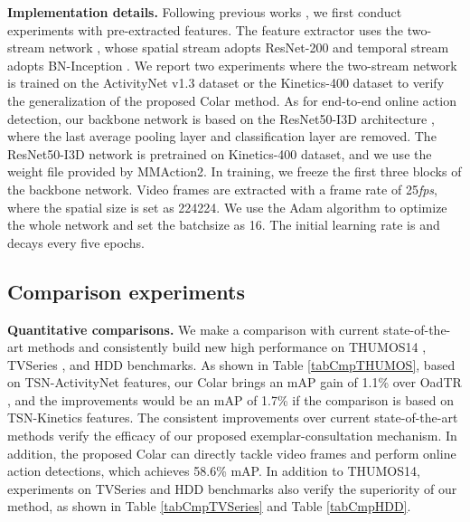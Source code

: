\documentclass[10pt,twocolumn,letterpaper]{article}
\begin{document}
\textbf{Implementation details.} Following previous works \cite{de2018modeling, xu2019temporal, eun2020learning, wang2021oadtr}, we first conduct experiments with pre-extracted features. The feature extractor uses the two-stream network \cite{xiong2016cuhk}, whose spatial stream adopts ResNet-200 \cite{he2016deep} and temporal stream adopts BN-Inception \cite{ioffe2015batch}. We report two experiments where the two-stream network \cite{wang2016temporal, xiong2016cuhk} is trained on the ActivityNet v1.3 dataset \cite{caba2015activitynet} or the Kinetics-400 \cite{carreira2017quo} dataset to verify the generalization of the proposed Colar method. As for end-to-end online action detection, our backbone network is based on the ResNet50-I3D architecture \cite{wang2018non}, where the last average pooling layer and classification layer are removed. The ResNet50-I3D network is pretrained on Kinetics-400 \cite{carreira2017quo} dataset, and we use the weight file provided by MMAction2\cite{2020mmaction2}. In training, we freeze the first three blocks of the backbone network. Video frames are extracted with a frame rate of 25\textit{fps}, where the spatial size is set as 224224. We use the Adam \cite{kingma2014adam} algorithm to optimize the whole network and set the batchsize as 16. The initial learning rate is  and decays every five epochs.


\subsection{Comparison experiments}
\label{ExpCmp}

\textbf{Quantitative comparisons.} We make a comparison with current state-of-the-art methods \cite{de2018modeling, xu2019temporal, eun2020learning, wang2021oadtr} and consistently build new high performance on THUMOS14 \cite{THUMOS14}, TVSeries \cite{de2016online}, and HDD \cite{ramanishka2018toward} benchmarks. As shown in Table \ref{tabCmpTHUMOS}, based on TSN-ActivityNet features, our Colar brings an mAP gain of 1.1\% over OadTR \cite{wang2021oadtr}, and the improvements would be an mAP of 1.7\% if the comparison is based on TSN-Kinetics features. The consistent improvements over current state-of-the-art methods verify the efficacy of our proposed exemplar-consultation mechanism. In addition, the proposed Colar can directly tackle video frames and perform online action detections, which achieves 58.6\% mAP. In addition to THUMOS14, experiments on TVSeries \cite{de2016online} and HDD \cite{ramanishka2018toward} benchmarks also verify the superiority of our method, as shown in Table \ref{tabCmpTVSeries} and Table \ref{tabCmpHDD}.
\end{document}

